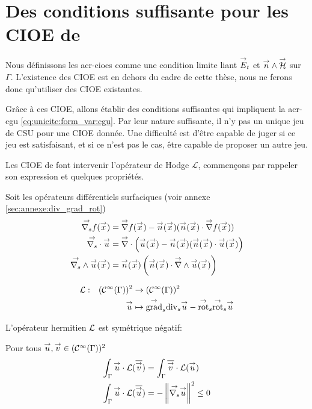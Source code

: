 \section[Des CSU pour les CIOE de Stupfel et Poget 2011]{Des conditions suffisante pour les CIOE de \cite{stupfel_sufficient_2011}}

  Nous définissons les \glspl{acr-cioe} comme une condition limite liant \({\overset{\rightarrow}{E}}_t\) et \({\overset{\rightarrow}{n}}\wedge{\overset{\rightarrow}{\mathcal{H}}}\) sur \(\Gamma\). L'existence des CIOE est en dehors du cadre de cette thèse, nous ne ferons donc qu'utiliser des CIOE existantes.

  Grâce à ces CIOE,   allons établir des conditions suffisantes qui impliquent la \gls{acr-cgu} \eqref{eq:unicite:form_var:cgu}. Par leur nature suffisante, il n'y pas un unique jeu de CSU pour une CIOE donnée. Une difficulté est d'être capable de juger si ce jeu est satisfaisant, et si ce n'est pas le cas, être capable de proposer un autre jeu.

  Les CIOE de \cite{stupfel_sufficient_2011} font intervenir l'opérateur de Hodge \(\mathcal{L}\), commençons par rappeler son expression et quelques propriétés.

  Soit les opérateurs différentiels surfaciques (voir annexe \ref{sec:annexe:div_grad_rot})
  \begin{align*}
        {\overset{\rightarrow}{\nabla_s}}{f}({\overset{\rightarrow}{x}}) &= {\overset{\rightarrow}{\nabla}}{f}({\overset{\rightarrow}{x}}) - {\overset{\rightarrow}{n}}({\overset{\rightarrow}{x}}) ({\overset{\rightarrow}{n}}({\overset{\rightarrow}{x}}) \cdot {\overset{\rightarrow}{\nabla}}{f}({\overset{\rightarrow}{x}}))
        \\
        {\overset{\rightarrow}{\nabla_s}} \cdot{{\overset{\rightarrow}{u}}} &= {\overset{\rightarrow}{\nabla}}\cdot\left({\overset{\rightarrow}{u}}({\overset{\rightarrow}{x}}) - {\overset{\rightarrow}{n}}({\overset{\rightarrow}{x}}) ({\overset{\rightarrow}{n}}({\overset{\rightarrow}{x}}) \cdot {\overset{\rightarrow}{u}}({\overset{\rightarrow}{x}})\right)
        \\
        {\overset{\rightarrow}{\nabla_s}} \wedge{{\overset{\rightarrow}{u}}}({\overset{\rightarrow}{x}}) &= {\overset{\rightarrow}{n}}({\overset{\rightarrow}{x}})\left({\overset{\rightarrow}{n}}({\overset{\rightarrow}{x}}) \cdot {\overset{\rightarrow}{\nabla}}\wedge{{\overset{\rightarrow}{u}}}({\overset{\rightarrow}{x}})\right)
    \end{align*}

  \begin{defn}
    \begin{equation}
      \label{eq:operator:L}
        \fonction{\LL}{(\mathcal{C}^\infty(\Gamma))^2}{(\mathcal{C}^\infty(\Gamma))^2}%
          {\vu}{\tgrads{\tdivs \vu} - \tvrots{\tvrots \vu}}
    \end{equation}
  \end{defn}

  \begin{prop}
    L’opérateur hermitien \(\mathcal{L}\) est symétrique négatif:

    Pour tous \({\overset{\rightarrow}{u}},{\overset{\rightarrow}{v}} \in (\mathcal C^\infty(\Gamma))^2\)
    \begin{align}
      \int_\Gamma \vu\cdot \LL(\conj{\vv}) &= \int_\Gamma \conj{\vv}\cdot \LL(\vu)
      \\
      \int_\Gamma \vu\cdot \LL(\conj{\vu}) &= -\norm{\vgrads{\vu}}^2 \le 0
      \label{eq:hodge:negatif}
    \end{align}
  \end{prop}


